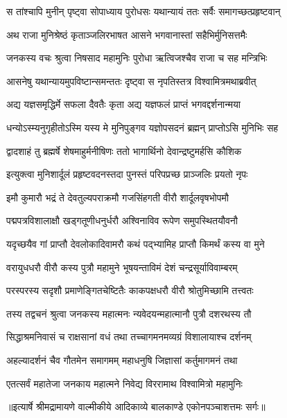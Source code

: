 \twolineshloka
{स तांश्चापि मुनीन् पृष्ट्वा सोपाध्याय पुरोधसः}
{यथान्यायं ततः सर्वैः समागच्छत्प्रहृष्टवान्} %

\twolineshloka
{अथ राजा मुनिश्रेष्ठं कृताञ्जलिरभाषत}
{आसने भगवानास्तां सहैभिर्मुनिसत्तमैः} %

\twolineshloka
{जनकस्य वचः श्रुत्वा निषसाद महामुनिः}
{पुरोधा ऋत्विजश्चैव राजा च सह मन्त्रिभिः} %

\twolineshloka
{आसनेषु यथान्यायमुपविष्टान्समन्ततः}
{दृष्ट्वा स नृपतिस्तत्र विश्वामित्रमथाब्रवीत्} %

\twolineshloka
{अद्य यज्ञसमृद्धिर्मे सफला दैवतैः कृता}
{अद्य यज्ञफलं प्राप्तं भगवद्दर्शनान्मया} %

\twolineshloka
{धन्योऽस्म्यनुगृहीतोऽस्मि यस्य मे मुनिपुङ्गव}
{यज्ञोपसदनं ब्रह्मन् प्राप्तोऽसि मुनिभिः सह} %

\twolineshloka
{द्वादशाहं तु ब्रह्मर्षे शेषमाहुर्मनीषिणः}
{ततो भागार्थिनो देवान्द्रष्टुमर्हसि कौशिक} %

\twolineshloka
{इत्युक्त्वा मुनिशार्दूलं प्रहृष्टवदनस्तदा}
{पुनस्तं परिपप्रच्छ प्राञ्जलिः प्रयतो नृपः} %

\twolineshloka
{इमौ कुमारौ भद्रं ते देवतुल्यपराक्रमौ}
{गजसिंहगती वीरौ शार्दूलवृषभोपमौ} %

\twolineshloka
{पद्मपत्रविशालाक्षौ खड्गतूणीधनुर्धरौ}
{अश्विनाविव रूपेण समुपस्थितयौवनौ} %

\twolineshloka
{यदृच्छयैव गां प्राप्तौ देवलोकादिवामरौ}
{कथं पद्भ्यामिह प्राप्तौ किमर्थं कस्य वा मुने} %

\twolineshloka
{वरायुधधरौ वीरौ कस्य पुत्रौ महामुने}
{भूषयन्ताविमं देशं चन्द्रसूर्याविवाम्बरम्} %

\twolineshloka
{परस्परस्य सदृशौ प्रमाणेङ्गितचेष्टितैः}
{काकपक्षधरौ वीरौ श्रोतुमिच्छामि तत्त्वतः} %

\twolineshloka
{तस्य तद्वचनं श्रुत्वा जनकस्य महात्मनः}
{न्यवेदयन्महात्मानौ पुत्रौ दशरथस्य तौ} %

\twolineshloka
{सिद्धाश्रमनिवासं च राक्षसानां वधं तथा}
{तच्चागमनमव्यग्रं विशालायाश्च दर्शनम्} %

\twolineshloka
{अहल्यादर्शनं चैव गौतमेन समागमम्}
{महाधनुषि जिज्ञासां कर्तुमागमनं तथा} %

\twolineshloka
{एतत्सर्वं महातेजा जनकाय महात्मने}
{निवेद्य विररामाथ विश्वामित्रो महामुनिः} %


{॥इत्यार्षे श्रीमद्रामायणे वाल्मीकीये आदिकाव्ये बालकाण्डे एकोनपञ्चाशत्तमः सर्गः॥}

